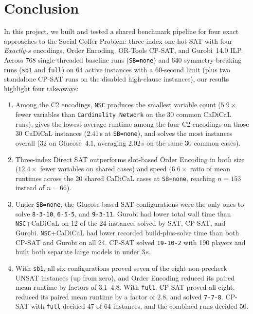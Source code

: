 \documentclass[a4paper,fleqn]{cas-sc}
\begin{document}
\section{Conclusion}
\label{sec:conclusion}

In this project, we built and tested a shared benchmark pipeline for four exact approaches to the Social Golfer Problem: three-index one-hot SAT with four \textit{Exactly}-$s$ encodings, Order Encoding, OR-Tools CP-SAT, and Gurobi~14.0 ILP. Across 768 single-threaded baseline runs (\texttt{SB=none}) and 640 symmetry-breaking runs (\texttt{sb1} and \texttt{full}) on 64 active instances with a 60-second limit (plus two standalone CP-SAT runs on the disabled high-clause instances), our results highlight four takeaways:
\begin{enumerate}[label=(\arabic*),noitemsep]
    \item Among the C2 encodings, \texttt{NSC} produces the smallest variable count ($5.9\times$ fewer variables than \texttt{Cardinality Network} on the 30 common CaDiCaL runs), gives the lowest average runtime among the four C2 encodings on those 30 CaDiCaL instances (2.41\,s at \texttt{SB=none}), and solves the most instances overall (32 on Glucose~4.1, averaging 2.02\,s on the same 30 common cases).
    \item Three-index Direct SAT outperforms slot-based Order Encoding in both size ($12.4\times$ fewer variables on shared cases) and speed ($6.6\times$ ratio of mean runtimes across the 20 shared CaDiCaL cases at \texttt{SB=none}, reaching $n=153$ instead of $n=66$).
    \item Under \texttt{SB=none}, the Glucose-based SAT configurations
    were the only ones to solve \texttt{8-3-10}, \texttt{6-5-5}, and
    \texttt{9-3-11}. Gurobi had lower total wall time than
    \texttt{NSC}+CaDiCaL on 12 of the 24 instances solved by SAT, CP-SAT,
    and Gurobi. \texttt{NSC}+CaDiCaL had lower recorded build-plus-solve
    time than both CP-SAT and Gurobi on all 24. CP-SAT solved
    \texttt{19-10-2} with 190 players and built both separate large
    models in under 3\,s.
    \item With \texttt{sb1}, all six configurations proved seven of the
    eight non-precheck UNSAT instances (up from zero), and Order Encoding
    reduced its paired mean runtime by factors of $3.1$--$4.8$.
    With \texttt{full}, CP-SAT proved all eight, reduced its paired mean
    runtime by a factor of $2.8$, and solved \texttt{7-7-8}. CP-SAT with
    \texttt{full} decided 47 of 64 instances, and the combined runs decided 50.
\end{enumerate}
\end{document}
